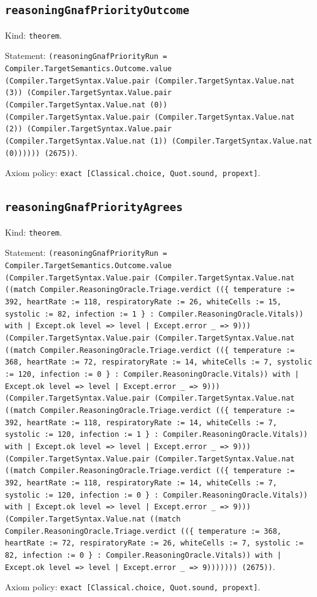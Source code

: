 \documentclass[11pt]{article}
\begin{document}
\subsection*{\texttt{reasoningGnafPriorityOutcome}}
\noindent Kind: \texttt{theorem}.\par
\noindent Statement: \texttt{(reasoningGnafPriorityRun = Compiler.TargetSemantics.Outcome.value (Compiler.TargetSyntax.Value.pair (Compiler.TargetSyntax.Value.nat (3)) (Compiler.TargetSyntax.Value.pair (Compiler.TargetSyntax.Value.nat (0)) (Compiler.TargetSyntax.Value.pair (Compiler.TargetSyntax.Value.nat (2)) (Compiler.TargetSyntax.Value.pair (Compiler.TargetSyntax.Value.nat (1)) (Compiler.TargetSyntax.Value.nat (0)))))) (2675))}.\par
\noindent Axiom policy: \texttt{exact [Classical.choice, Quot.sound, propext]}.\par
\subsection*{\texttt{reasoningGnafPriorityAgrees}}
\noindent Kind: \texttt{theorem}.\par
\noindent Statement: \texttt{(reasoningGnafPriorityRun = Compiler.TargetSemantics.Outcome.value (Compiler.TargetSyntax.Value.pair (Compiler.TargetSyntax.Value.nat ((match Compiler.ReasoningOracle.Triage.verdict ((\{ temperature := 392, heartRate := 118, respiratoryRate := 26, whiteCells := 15, systolic := 82, infection := 1 \} : Compiler.ReasoningOracle.Vitals)) with | Except.ok level => level | Except.error \_ => 9))) (Compiler.TargetSyntax.Value.pair (Compiler.TargetSyntax.Value.nat ((match Compiler.ReasoningOracle.Triage.verdict ((\{ temperature := 368, heartRate := 72, respiratoryRate := 14, whiteCells := 7, systolic := 120, infection := 0 \} : Compiler.ReasoningOracle.Vitals)) with | Except.ok level => level | Except.error \_ => 9))) (Compiler.TargetSyntax.Value.pair (Compiler.TargetSyntax.Value.nat ((match Compiler.ReasoningOracle.Triage.verdict ((\{ temperature := 392, heartRate := 118, respiratoryRate := 14, whiteCells := 7, systolic := 120, infection := 1 \} : Compiler.ReasoningOracle.Vitals)) with | Except.ok level => level | Except.error \_ => 9))) (Compiler.TargetSyntax.Value.pair (Compiler.TargetSyntax.Value.nat ((match Compiler.ReasoningOracle.Triage.verdict ((\{ temperature := 392, heartRate := 118, respiratoryRate := 14, whiteCells := 7, systolic := 120, infection := 0 \} : Compiler.ReasoningOracle.Vitals)) with | Except.ok level => level | Except.error \_ => 9))) (Compiler.TargetSyntax.Value.nat ((match Compiler.ReasoningOracle.Triage.verdict ((\{ temperature := 368, heartRate := 72, respiratoryRate := 26, whiteCells := 7, systolic := 82, infection := 0 \} : Compiler.ReasoningOracle.Vitals)) with | Except.ok level => level | Except.error \_ => 9))))))) (2675))}.\par
\noindent Axiom policy: \texttt{exact [Classical.choice, Quot.sound, propext]}.\par
\end{document}
